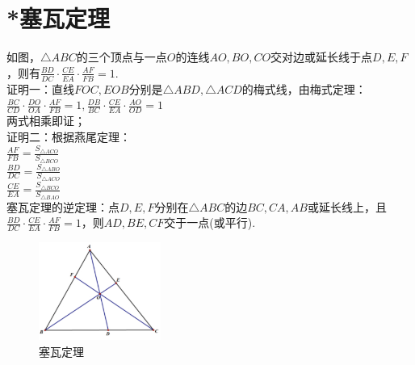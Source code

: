 \documentclass{ecnuthesis}
\begin{document}
\section{*塞瓦定理}
\begin{model}
    如图，$\triangle ABC$的三个顶点与一点$O$的连线$AO,BO,CO$交对边或延长线于点$D,E,F$，则有$\frac{BD}{DC}·\frac{CE}{EA}·\frac{AF}{FB}=1$. \\
    证明一：直线$FOC,EOB$分别是$\triangle ABD,\triangle ACD$的梅式线，由梅式定理： \\
    $\frac{BC}{CD}·\frac{DO}{OA}·\frac{AF}{FB}=1,\frac{DB}{BC}·\frac{CE}{EA}·\frac{AO}{OD}=1$ \\
    两式相乘即证；\\
    证明二：根据燕尾定理：\\
    $\frac{AF}{FB}=\frac{S_{\triangle ACO}}{S_{\triangle BCO}}$ \\
    $\frac{BD}{DC}=\frac{S_{\triangle ABO}}{S_{\triangle ACO}}$ \\
    $\frac{CE}{EA}=\frac{S_{\triangle BCO}}{S_{\triangle BAO}}$ \\
    塞瓦定理的逆定理：点$D,E,F$分别在$\triangle ABC$的边$BC,CA,AB$或延长线上，且$\frac{BD}{DC}·\frac{CE}{EA}·\frac{AF}{FB}=1$，则$AD,BE,CF$交于一点(或平行). \\
\end{model}
\begin{figure}[H]
\centering
\includegraphics[width=4cm]{picture/844.png}
\caption{塞瓦定理}
\end{figure}
\clearpage
\end{document}
